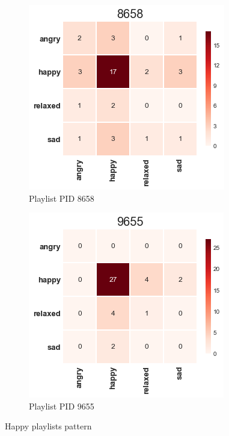 \begin{figure}[H]
  \centering
  \begin{subfigure}[b]{0.49\linewidth}
    \includegraphics[width=\linewidth]{./chapters/chapter5/images/8658.png}
    \caption{Playlist PID 8658}
  \end{subfigure}
  \begin{subfigure}[b]{0.49\linewidth}
   \includegraphics[width=\linewidth]{./chapters/chapter5/images/9655.png}
    \caption{Playlist PID 9655}
  \end{subfigure}
  \caption{Happy playlists pattern}
  \label{fig:ann}
\end{figure}


